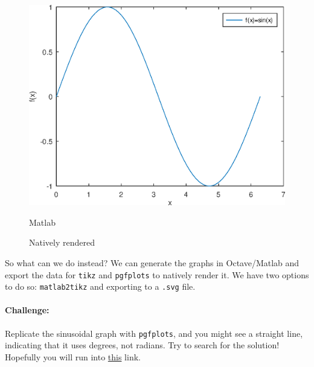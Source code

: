 \begin{figure}[h]
\centering
\begin{minipage}{0.50\textwidth}
    \includegraphics[width=\textwidth]{Examples/Importing-graphs/bitmap/figures/example.eps}
    \caption{Matlab}
\end{minipage}
\hfill
\begin{minipage}{0.48\textwidth}
    \caption{Natively rendered}
\end{minipage}
\end{figure}

So what can we do instead? We can generate the graphs in Octave/Matlab and export the data for \texttt{tikz} and \texttt{pgfplots} to natively render it.
We have two options to do so: \texttt{matlab2tikz} and exporting to a \texttt{.svg} file.

\paragraph{Challenge:}
Replicate the sinusoidal graph with \texttt{pgfplots}, and you might see a straight line, indicating that it uses degrees, not radians.
Try to search for the solution!
Hopefully you will run into \href{https://tex.stackexchange.com/questions/16232/how-to-plot-fx-sinx-kx-cosx-and-ux-x%C2%B2-with-tikz}{this} link.

